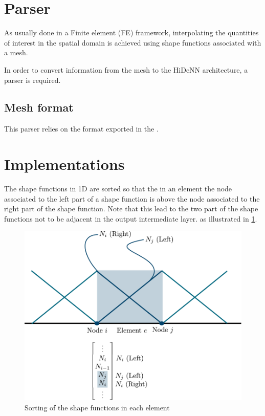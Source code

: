 \section{Parser}

As usually done in a Finite element (FE) framework, interpolating the quantities of interest in the spatial domain is achieved using shape functions associated with a mesh.

In order to convert information from the mesh to the HiDeNN architecture, a parser is required.

\subsection{Mesh format}
This parser relies on the  format exported in the .


\section{Implementations}



The shape functions in 1D are sorted so that the in an element the node associated to the left part of a shape function is above the node associated to the right part of the shape function. 
Note that this lead to the two part of the shape functions not to be adjacent in the output intermediate layer. as illustrated in \cref{fig:SortingSF}.

\begin{figure}
    \centering
    \includegraphics[width = 0.7\linewidth]{Figures/SortingOfShapeFunctions.pdf}
    \caption{Sorting of the shape functions in each element}
    \label{fig:SortingSF}
\end{figure}